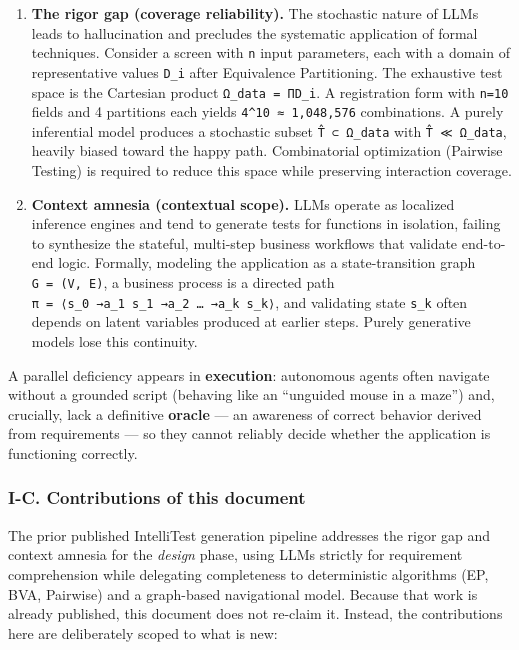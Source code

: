 \documentclass[
]{article}
\begin{document}
\begin{enumerate}
\def\labelenumi{\arabic{enumi}.}
\item
  \textbf{The rigor gap (coverage reliability).} The stochastic nature
  of LLMs leads to hallucination and precludes the systematic
  application of formal techniques. Consider a screen with \texttt{n}
  input parameters, each with a domain of representative values
  \texttt{D\_i} after Equivalence Partitioning. The exhaustive test
  space is the Cartesian product
  \texttt{\textbar{}Ω\_data\textbar{}\ =\ Π\textbar{}D\_i\textbar{}}. A
  registration form with \texttt{n=10} fields and 4 partitions each
  yields \texttt{4\^{}10\ ≈\ 1,048,576} combinations. A purely
  inferential model produces a stochastic subset \texttt{T̂\ ⊂\ Ω\_data}
  with \texttt{\textbar{}T̂\textbar{}\ ≪\ \textbar{}Ω\_data\textbar{}},
  heavily biased toward the happy path. Combinatorial optimization
  (Pairwise Testing) is required to reduce this space while preserving
  interaction coverage.
\item
  \textbf{Context amnesia (contextual scope).} LLMs operate as localized
  inference engines and tend to generate tests for functions in
  isolation, failing to synthesize the stateful, multi-step business
  workflows that validate end-to-end logic. Formally, modeling the
  application as a state-transition graph \texttt{G\ =\ (V,\ E)}, a
  business process is a directed path
  \texttt{π\ =\ ⟨s\_0\ →a\_1\ s\_1\ →a\_2\ …\ →a\_k\ s\_k⟩}, and
  validating state \texttt{s\_k} often depends on latent variables
  produced at earlier steps. Purely generative models lose this
  continuity.
\end{enumerate}

A parallel deficiency appears in \textbf{execution}: autonomous agents
often navigate without a grounded script (behaving like an ``unguided
mouse in a maze'') and, crucially, lack a definitive \textbf{oracle} ---
an awareness of correct behavior derived from requirements --- so they
cannot reliably decide whether the application is functioning correctly.

\subsubsection{I-C. Contributions of this
document}\label{i-c.-contributions-of-this-document}

The prior published IntelliTest generation pipeline addresses the rigor
gap and context amnesia for the \emph{design} phase, using LLMs strictly
for requirement comprehension while delegating completeness to
deterministic algorithms (EP, BVA, Pairwise) and a graph-based
navigational model. Because that work is already published, this
document does not re-claim it. Instead, the contributions here are
deliberately scoped to what is new:
\end{document}
